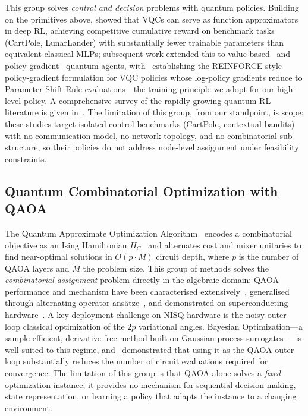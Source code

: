 \documentclass[11pt,a4paper]{article}
\theoremstyle{definition}
\begin{document}
This group solves \emph{control and decision} problems with quantum policies. Building on the primitives above, \cite{vqc_drl} showed that VQCs can serve as function approximators in deep RL, achieving competitive cumulative reward on benchmark tasks (CartPole, LunarLander) with substantially fewer trainable parameters than equivalent classical MLPs; subsequent work extended this to value-based~\cite{skolik2022qdqn} and policy-gradient~\cite{jerbi2021policies,sequeira2023policygradient} quantum agents, with~\cite{sequeira2023policygradient} establishing the REINFORCE-style policy-gradient formulation for VQC policies whose log-policy gradients reduce to Parameter-Shift-Rule evaluations---the training principle we adopt for our high-level policy. A comprehensive survey of the rapidly growing quantum RL literature is given in~\cite{meyer2024qrlsurvey}. The limitation of this group, from our standpoint, is scope: these studies target isolated control benchmarks (CartPole, contextual bandits) with no communication model, no network topology, and no combinatorial sub-structure, so their policies do not address node-level assignment under feasibility constraints.

\subsection{Quantum Combinatorial Optimization with QAOA}
\label{subsec:rw_qaoa}

The Quantum Approximate Optimization Algorithm~\cite{farhi2014quantum} encodes a combinatorial objective as an Ising Hamiltonian $H_C$~\cite{lucas2014ising} and alternates cost and mixer unitaries to find near-optimal solutions in $O(p \cdot M)$ circuit depth, where $p$ is the number of QAOA layers and $M$ the problem size. This group of methods solves the \emph{combinatorial assignment} problem directly in the algebraic domain: QAOA performance and mechanism have been characterised extensively~\cite{zhou2020qaoa}, generalised through alternating operator ans\"atze~\cite{hadfield2019qaoa}, and demonstrated on superconducting hardware~\cite{harrigan2021qaoa}. A key deployment challenge on NISQ hardware is the noisy outer-loop classical optimization of the $2p$ variational angles. Bayesian Optimization---a sample-efficient, derivative-free method built on Gaussian-process surrogates~\cite{rasmussen2006gp,shahriari2016bo,snoek2012bo,frazier2018bo}---is well suited to this regime, and~\cite{bo_qaoa} demonstrated that using it as the QAOA outer loop substantially reduces the number of circuit evaluations required for convergence. The limitation of this group is that QAOA alone solves a \emph{fixed} optimization instance; it provides no mechanism for sequential decision-making, state representation, or learning a policy that adapts the instance to a changing environment.
\end{document}
